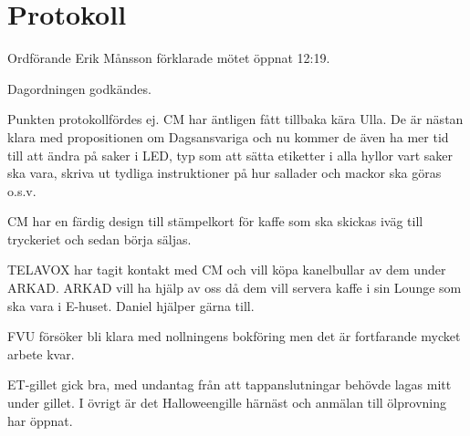 \documentclass[10pt]{article}
\def\mo{Erik Månsson}
\begin{document}
\section*{Protokoll}
\begin{paragrafer}
Ordförande {\mo} förklarade mötet öppnat 12:19.

{\valavmo}

{\valavms}

{\valavj}

{\tosg}

{\ingaadj}


Dagordningen godkändes.

\ingaprot

\begin{fyllnadsval} %
\end{fyllnadsval}
\newpage
{}
\begin{paragrafer}
Punkten protokollfördes ej.
CM har äntligen fått tillbaka kära Ulla. De är nästan klara med propositionen om Dagsansvariga och nu kommer de även ha mer tid till att ändra på saker i LED, typ som att sätta etiketter i alla hyllor vart saker ska vara, skriva ut tydliga instruktioner på hur sallader och mackor ska göras o.s.v.

CM har en färdig design till stämpelkort för kaffe som ska skickas iväg till tryckeriet och sedan börja säljas.

TELAVOX har tagit kontakt med CM och vill köpa kanelbullar av dem under ARKAD. ARKAD vill ha hjälp av oss då dem vill servera kaffe i sin Lounge som ska vara i E-huset. Daniel hjälper gärna till.

FVU försöker bli klara med nollningens bokföring men det är fortfarande mycket arbete kvar.

ET-gillet gick bra, med undantag från att tappanslutningar behövde lagas mitt under gillet. I övrigt är det Halloweengille härnäst och anmälan till ölprovning har öppnat.


\end{paragrafer}
\end{paragrafer}
\end{document}
